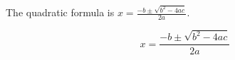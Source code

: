 \documentclass{article}
\begin{document}
    The quadratic formula is $x = \frac{-b\pm\sqrt{b^2 - 4ac}}{2a}$.

    \[
        x = \frac{-b\pm\sqrt{b^2-4ac}}{2a}
    \]
\end{document}
